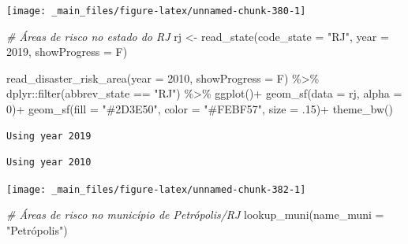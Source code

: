\documentclass[
  brazilian,
]{book}
\newenvironment{Shaded}{\begin{snugshade}}{\end{snugshade}}
\newcommand{\AttributeTok}[1]{\textcolor[rgb]{0.77,0.63,0.00}{#1}}
\newcommand{\CommentTok}[1]{\textcolor[rgb]{0.56,0.35,0.01}{\textit{#1}}}
\newcommand{\DecValTok}[1]{\textcolor[rgb]{0.00,0.00,0.81}{#1}}
\newcommand{\FunctionTok}[1]{\textcolor[rgb]{0.00,0.00,0.00}{#1}}
\newcommand{\NormalTok}[1]{#1}
\newcommand{\OtherTok}[1]{\textcolor[rgb]{0.56,0.35,0.01}{#1}}
\newcommand{\SpecialCharTok}[1]{\textcolor[rgb]{0.00,0.00,0.00}{#1}}
\newcommand{\StringTok}[1]{\textcolor[rgb]{0.31,0.60,0.02}{#1}}
\begin{document}
\begin{center}\texttt{[image: \_main\_files/figure-latex/unnamed-chunk-380-1]} \end{center}

\begin{Shaded}
\begin{Highlighting}[]
\CommentTok{\# Áreas de risco no estado do RJ}
\NormalTok{rj }\OtherTok{\textless{}{-}} \FunctionTok{read\_state}\NormalTok{(}\AttributeTok{code\_state =} \StringTok{"RJ"}\NormalTok{,}
                 \AttributeTok{year =} \DecValTok{2019}\NormalTok{,}
                 \AttributeTok{showProgress =}\NormalTok{ F)}

\FunctionTok{read\_disaster\_risk\_area}\NormalTok{(}\AttributeTok{year =} \DecValTok{2010}\NormalTok{,}
                        \AttributeTok{showProgress =}\NormalTok{ F) }\SpecialCharTok{\%\textgreater{}\%}
\NormalTok{  dplyr}\SpecialCharTok{::}\FunctionTok{filter}\NormalTok{(abbrev\_state }\SpecialCharTok{==} \StringTok{"RJ"}\NormalTok{) }\SpecialCharTok{\%\textgreater{}\%}
  \FunctionTok{ggplot}\NormalTok{()}\SpecialCharTok{+}
  \FunctionTok{geom\_sf}\NormalTok{(}\AttributeTok{data =}\NormalTok{ rj, }\AttributeTok{alpha =} \DecValTok{0}\NormalTok{)}\SpecialCharTok{+}
  \FunctionTok{geom\_sf}\NormalTok{(}\AttributeTok{fill =} \StringTok{"\#2D3E50"}\NormalTok{, }\AttributeTok{color =} \StringTok{"\#FEBF57"}\NormalTok{, }\AttributeTok{size =}\NormalTok{ .}\DecValTok{15}\NormalTok{)}\SpecialCharTok{+}
  \FunctionTok{theme\_bw}\NormalTok{()}
\end{Highlighting}
\end{Shaded}

\begin{verbatim}
Using year 2019
\end{verbatim}

\begin{verbatim}
Using year 2010
\end{verbatim}

\begin{center}\texttt{[image: \_main\_files/figure-latex/unnamed-chunk-382-1]} \end{center}

\begin{Shaded}
\begin{Highlighting}[]
\CommentTok{\# Áreas de risco no município de Petrópolis/RJ}
\FunctionTok{lookup\_muni}\NormalTok{(}\AttributeTok{name\_muni =} \StringTok{"Petrópolis"}\NormalTok{)}
\end{Highlighting}
\end{Shaded}
\end{document}

